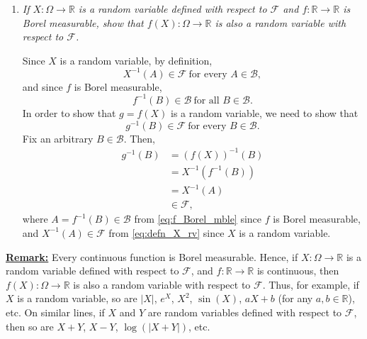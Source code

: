 \documentclass[11pt]{article}
\begin{document}
\begin{enumerate}
\item \emph{If $X:\Omega\to \mathbb{R}$ is a random variable defined with respect to $\mathcal{F}$ and $f:\mathbb{R}\to \mathbb{R}$ is Borel measurable, show that $f(X):\Omega\to \mathbb{R}$ is also a random variable with respect to $\mathcal{F}$.}

\par Since $X$ is a random variable, by definition,
\begin{equation}
X^{-1}(A)\in \mathcal{F}~\text{for every }A\in \mathcal{B},\label{eq:defn_X_rv}
\end{equation}
and since $f$ is Borel measurable, 
\begin{equation}
f^{-1}(B)\in \mathcal{B}~\text{for all }B\in \mathcal{B}.\label{eq:f_Borel_mble}
\end{equation}
In order to show that $g=f(X)$ is a random variable, we need to show that
\begin{equation}
g^{-1}(B)\in \mathcal{F}~\text{for every }B\in \mathcal{B}.
\end{equation}
Fix an arbitrary $B\in \mathcal{B}$. Then, 
\begin{align}
g^{-1}(B)&=(f(X))^{-1}(B)\nonumber\\
&=X^{-1}(f^{-1}(B))\nonumber\\
&=X^{-1}(A)\nonumber\\
&\in \mathcal{F},
\end{align}
where $A=f^{-1}(B)\in \mathcal{B}$ from \eqref{eq:f_Borel_mble} since $f$ is Borel measurable, and $X^{-1}(A)\in \mathcal{F}$ from \eqref{eq:defn_X_rv} since $X$ is a random variable.\\
\end{enumerate}

\textbf{\underline{Remark:}} Every continuous function is Borel measurable. Hence, if $X:\Omega\to \mathbb{R}$ is a random variable defined with respect to $\mathcal{F}$, and $f:\mathbb{R}\to \mathbb{R}$ is continuous, then $f(X):\Omega\to \mathbb{R}$ is also a random variable with respect to $\mathcal{F}$. Thus, for example, if $X$ is a random variable, so are $|X|$, $e^{X}$, $X^{2}$, $\sin(X)$, $aX+b$ (for any $a,b\in \mathbb{R}$), etc. On similar lines, if $X$ and $Y$ are random variables defined with respect to $\mathcal{F}$, then so are $X+Y$, $X-Y$, $\log(|X+Y|)$, etc.\\
\vspace{0.2cm}\\
\end{document}
